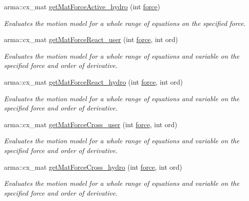 \begin{DoxyCompactItemize}
arma\-::cx\-\_\-mat \hyperlink{classosea_1_1ofreq_1_1_motion_model_a56059a3d7f37c9dad5f906714ba159de}{get\-Mat\-Force\-Active\-\_\-hydro} (int \hyperlink{input__syntax_8dox_ab0a92c70357da47fe86696522eab7dc8}{force})
\begin{DoxyCompactList}\small\item\em Evaluates the motion model for a whole range of equations on the specified force. \end{DoxyCompactList}\item 
arma\-::cx\-\_\-mat \hyperlink{classosea_1_1ofreq_1_1_motion_model_a44e885c0255e74d82664c785499138f0}{get\-Mat\-Force\-React\-\_\-user} (int \hyperlink{input__syntax_8dox_ab0a92c70357da47fe86696522eab7dc8}{force}, int ord)
\begin{DoxyCompactList}\small\item\em Evaluates the motion model for a whole range of equations and variable on the specified force and order of derivative. \end{DoxyCompactList}\item 
arma\-::cx\-\_\-mat \hyperlink{classosea_1_1ofreq_1_1_motion_model_af239389973af6d198a21ee0c07db19c6}{get\-Mat\-Force\-React\-\_\-hydro} (int \hyperlink{input__syntax_8dox_ab0a92c70357da47fe86696522eab7dc8}{force}, int ord)
\begin{DoxyCompactList}\small\item\em Evaluates the motion model for a whole range of equations and variable on the specified force and order of derivative. \end{DoxyCompactList}\item 
arma\-::cx\-\_\-mat \hyperlink{classosea_1_1ofreq_1_1_motion_model_addbd875f2fc266823f645fc7f2d207e8}{get\-Mat\-Force\-Cross\-\_\-user} (int \hyperlink{input__syntax_8dox_ab0a92c70357da47fe86696522eab7dc8}{force}, int ord)
\begin{DoxyCompactList}\small\item\em Evaluates the motion model for a whole range of equations and variable on the specified force and order of derivative. \end{DoxyCompactList}\item 
arma\-::cx\-\_\-mat \hyperlink{classosea_1_1ofreq_1_1_motion_model_a7d661c296c3fe5c97322a62cceabb5d4}{get\-Mat\-Force\-Cross\-\_\-hydro} (int \hyperlink{input__syntax_8dox_ab0a92c70357da47fe86696522eab7dc8}{force}, int ord)
\begin{DoxyCompactList}\small\item\em Evaluates the motion model for a whole range of equations and variable on the specified force and order of derivative. \end{DoxyCompactList}\item 

\end{DoxyCompactItemize}

